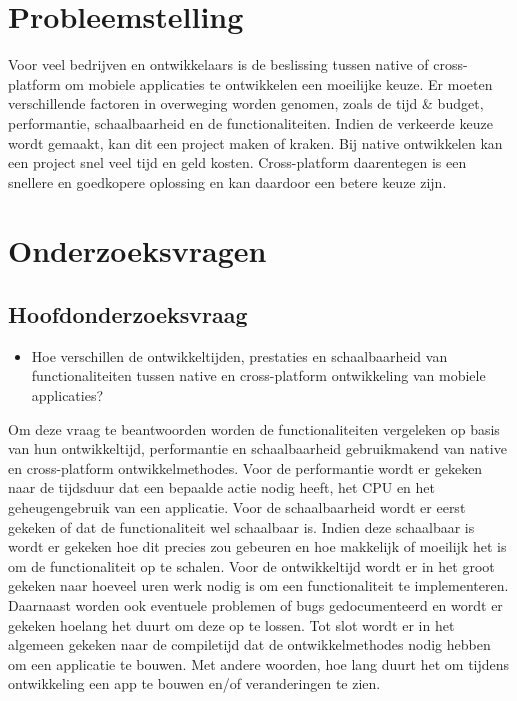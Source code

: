 \section{Probleemstelling}%
\label{sec:probleemstelling}

Voor veel bedrijven en ontwikkelaars is de beslissing tussen native of cross-platform om mobiele applicaties te ontwikkelen een moeilijke keuze. 
Er moeten verschillende factoren in overweging worden genomen, zoals de tijd \& budget, performantie, schaalbaarheid en de functionaliteiten. 
Indien de verkeerde keuze wordt gemaakt, kan dit een project maken of kraken. Bij native ontwikkelen kan een project snel veel tijd en geld kosten. 
Cross-platform daarentegen is een snellere en goedkopere oplossing en kan daardoor een betere keuze zijn.

\section{Onderzoeksvragen}%
\label{sec:onderzoeksvraag}

\subsection{Hoofdonderzoeksvraag}
\begin{itemize}
    \item Hoe verschillen de ontwikkeltijden, prestaties en schaalbaarheid van functionaliteiten tussen native en cross-platform ontwikkeling van mobiele applicaties?
\end{itemize}
Om deze vraag te beantwoorden worden de functionaliteiten vergeleken op basis van hun ontwikkeltijd, 
performantie en schaalbaarheid gebruikmakend van native en cross-platform ontwikkelmethodes. 
Voor de performantie wordt er gekeken naar de tijdsduur dat een bepaalde actie nodig heeft, het CPU en het geheugengebruik van een applicatie.
Voor de schaalbaarheid wordt er eerst gekeken of dat de functionaliteit wel schaalbaar is. 
Indien deze schaalbaar is wordt er gekeken hoe dit precies zou gebeuren en hoe makkelijk of moeilijk het is om de functionaliteit op te schalen. 
Voor de ontwikkeltijd wordt er in het groot gekeken naar hoeveel uren werk nodig is om een functionaliteit te implementeren. 
Daarnaast worden ook eventuele problemen of bugs gedocumenteerd en wordt er gekeken hoelang het duurt om deze op te lossen. 
Tot slot wordt er in het algemeen gekeken naar de compiletijd dat de ontwikkelmethodes nodig hebben om een applicatie te bouwen.
Met andere woorden, hoe lang duurt het om tijdens ontwikkeling een app te bouwen en/of veranderingen te zien.

